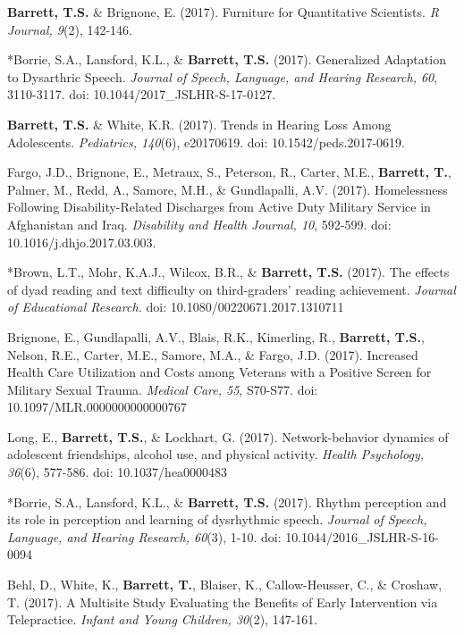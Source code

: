 \documentclass[]{DissertateUSU}
\begin{document}
\setlength{\parindent}{-.5in} \setlength{\leftskip}{1in}
\setlength{\parskip}{6pt} \noindent

\normalsize

\textbf{Barrett, T.S.} \& Brignone, E. (2017). Furniture for
Quantitative Scientists. \emph{R Journal, 9}(2), 142-146.

*Borrie, S.A., Lansford, K.L., \& \textbf{Barrett, T.S.} (2017).
Generalized Adaptation to Dysarthric Speech.
\emph{Journal of Speech, Language, and Hearing Research, 60}, 3110-3117.
doi: 10.1044/2017\_JSLHR-S-17-0127.

\textbf{Barrett, T.S.} \& White, K.R. (2017). Trends in Hearing Loss
Among Adolescents. \emph{Pediatrics, 140}(6), e20170619. doi:
10.1542/peds.2017-0619.

Fargo, J.D., Brignone, E., Metraux, S., Peterson, R., Carter, M.E.,
\textbf{Barrett, T.}, Palmer, M., Redd, A., Samore, M.H., \&
Gundlapalli, A.V. (2017). Homelessness Following Disability-Related
Discharges from Active Duty Military Service in Afghanistan and Iraq.
\emph{Disability and Health Journal, 10}, 592-599. doi:
10.1016/j.dhjo.2017.03.003.

*Brown, L.T., Mohr, K.A.J., Wilcox, B.R., \& \textbf{Barrett, T.S.}
(2017). The effects of dyad reading and text difficulty on
third-graders' reading achievement.
\emph{Journal of Educational Research.} doi:
10.1080/00220671.2017.1310711

Brignone, E., Gundlapalli, A.V., Blais, R.K., Kimerling, R.,
\textbf{Barrett, T.S.}, Nelson, R.E., Carter, M.E., Samore, M.A., \&
Fargo, J.D. (2017). Increased Health Care Utilization and Costs among
Veterans with a Positive Screen for Military Sexual Trauma.
\emph{Medical Care, 55}, S70-S77. doi: 10.1097/MLR.0000000000000767

Long, E., \textbf{Barrett, T.S.}, \& Lockhart, G. (2017).
Network-behavior dynamics of adolescent friendships, alcohol use, and
physical activity. \emph{Health Psychology, 36}(6), 577-586. doi:
10.1037/hea0000483

*Borrie, S.A., Lansford, K.L., \& \textbf{Barrett, T.S.} (2017). Rhythm
perception and its role in perception and learning of dysrhythmic
speech. \emph{Journal of Speech, Language, and Hearing Research, 60}(3),
1-10. doi: 10.1044/2016\_JSLHR-S-16-0094

Behl, D., White, K., \textbf{Barrett, T.}, Blaiser, K., Callow-Heusser,
C., \& Croshaw, T. (2017). A Multisite Study Evaluating the Benefits of
Early Intervention via Telepractice.
\emph{Infant and Young Children, 30}(2), 147-161.
\end{document}
